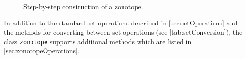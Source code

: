 \begin{figure}[htb]
	\centering
	\caption{Step-by-step construction of a zonotope.}
	\label{fig:zonotope}
\end{figure}

In addition to the standard set operations described in \cref{sec:setOperations} and the methods for converting between set operations (see \cref{tab:setConversion}), the class \texttt{zonotope} supports additional methods which are listed in \cref{sec:zonotopeOperations}.